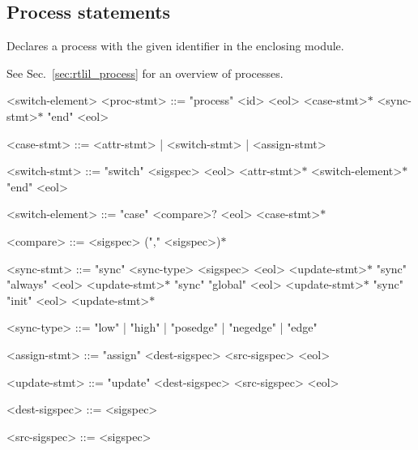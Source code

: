 \subsection{Process statements}

Declares a process with the given identifier in the enclosing module.

See Sec.~\ref{sec:rtlil_process} for an overview of processes.

\begin{indentgrammar}{<switch-element>}
<proc-stmt> ::= "process" <id> <eol> <case-stmt>$*$ <sync-stmt>$*$ "end" <eol>

<case-stmt> ::= <attr-stmt> | <switch-stmt> | <assign-stmt>

<switch-stmt> ::= "switch" <sigspec> <eol> <attr-stmt>$*$ <switch-element>$*$ "end" <eol>

<switch-element> ::= "case" <compare>$?$ <eol> <case-stmt>$*$

<compare> ::= <sigspec> ("," <sigspec>)$*$

<sync-stmt> ::= 
"sync" <sync-type> <sigspec> <eol> <update-stmt>$*$
  \alt "sync" "always" <eol> <update-stmt>$*$
  \alt "sync" "global" <eol> <update-stmt>$*$
  \alt "sync" "init" <eol> <update-stmt>$*$

<sync-type> ::= "low" | "high" | "posedge" | "negedge" | "edge"

<assign-stmt> ::= "assign" <dest-sigspec> <src-sigspec> <eol>

<update-stmt> ::= "update" <dest-sigspec> <src-sigspec> <eol>

<dest-sigspec> ::= <sigspec>

<src-sigspec> ::= <sigspec>
\end{indentgrammar}

